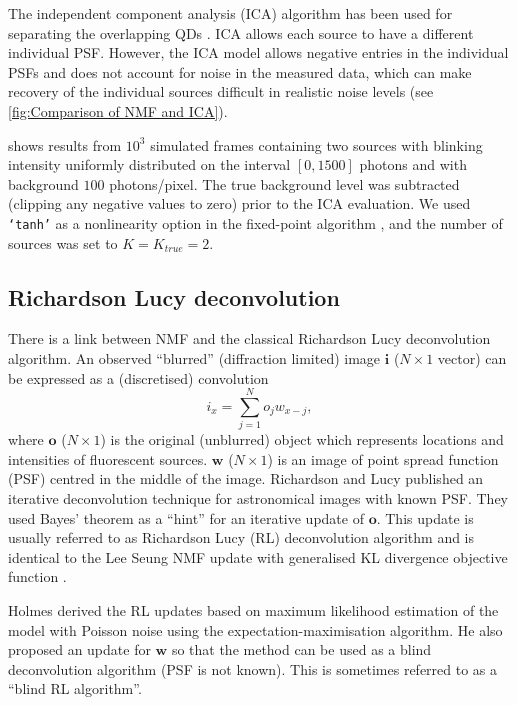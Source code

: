 The independent component analysis (ICA) algorithm \cite{Hyvarinen2000} has been used for separating the overlapping QDs \cite{Lidke2005,Lidke2007}. ICA allows each source to have a different individual PSF.  However, the ICA model allows negative entries in the individual PSFs and does not account for noise in the measured data, which can make recovery of the individual sources difficult in realistic noise levels (see \autoref{fig:Comparison of NMF and ICA}). 

\bbb{} shows results from $10^3$ simulated frames containing two sources with blinking intensity uniformly distributed on the interval $[0, 1500]$ photons and with background $100$ photons/pixel. The true background level was subtracted (clipping any negative values to zero) prior to the ICA evaluation. We used {\tt `tanh'} as a nonlinearity option in the fixed-point algorithm \cite{Hyvarinen2000}, and the number of sources was set to $K=K_{true}=2$. 



\subsection{Richardson \textendash{} Lucy deconvolution \label{sub:RL deconvolution}}
There is a link between NMF and the classical Richardson \textendash{} Lucy deconvolution algorithm. An observed ``blurred'' (diffraction limited) image $\bm{i}$ ($N\times1$ vector) can be expressed as a (discretised) convolution 
%
\begin{equation} 
	i_x=\sum_{j=1}^N o_j w_{x-j}, 
\end{equation} 
%
where $\bm{o}$ ($N\times1$) is the original (unblurred) object which represents locations and intensities of fluorescent sources. $\bm{w}$ ($N\times1$) is an image of point spread function (PSF) centred in the middle of the image. Richardson \cite{Richardson1972} and Lucy \cite{Lucy1974} published an iterative deconvolution technique for astronomical images with known PSF. They used Bayes' theorem as a ``hint'' for an iterative update of $\bm{o}$. This update is usually referred to as Richardson \textendash{} Lucy (RL) deconvolution algorithm and is identical to the Lee \textendash{} Seung NMF update with generalised KL divergence objective function \cite{Lee2001}. 

Holmes \cite{Holmes:92} derived the RL updates based on maximum likelihood estimation of the model with Poisson noise using the expectation-maximisation algorithm. He also proposed an update for $\bm{w}$ so that the method can be used as a blind deconvolution algorithm (PSF is not known). This is sometimes referred to as a ``blind RL algorithm''. 

